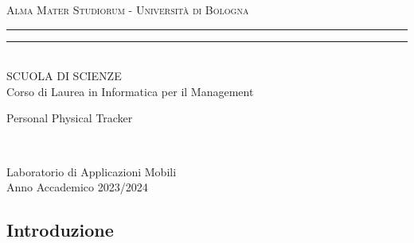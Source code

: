 \documentclass{article}
\begin{document}
    \pagestyle{empty}
    \begin{titlepage}
        \begin{center}
        {{\Large{\textsc{Alma Mater Studiorum - Università di Bologna}}}}
            \rule[0.1cm]{\textwidth}{0.1px}
            \rule[0.5cm]{\textwidth}{0.6px}\\
            {\large{SCUOLA DI SCIENZE \\ Corso di Laurea in Informatica per il Management}}
        \end{center}

        \vspace{90px}

        \begin{center}
            \LARGE Personal Physical Tracker
        \end{center}

        \vspace{100px}
        \par
        \noindent
        \hfill
        \begin{minipage}[t]{0.4\textwidth}\raggedleft
        {\fontsize{12}{13}{}\
            }
        \end{minipage}

        \vspace*{140px}

        \begin{center}
            \large{Laboratorio di Applicazioni Mobili}\\
            \large{Anno Accademico 2023/2024}
        \end{center}
    \end{titlepage}

    \newpage
    \subsection*{Introduzione}
    \large
\end{document}
